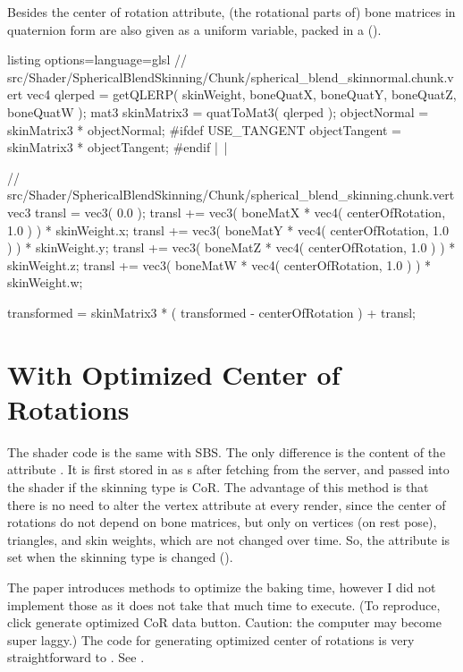\documentclass{homework}
\begin{document}
Besides the center of rotation attribute, (the rotational parts of) bone matrices in quaternion form are also given as a uniform variable, packed in a  ().

\begin{tcblisting}{listing options={language=glsl}}
// src/Shader/SphericalBlendSkinning/Chunk/spherical_blend_skinnormal.chunk.vert
vec4 qlerped = getQLERP( skinWeight, boneQuatX, boneQuatY, boneQuatZ, boneQuatW );
mat3 skinMatrix3 = quatToMat3( qlerped );
objectNormal = skinMatrix3 * objectNormal;
#ifdef USE_TANGENT
  objectTangent = skinMatrix3 * objectTangent;
#endif |\ |

// src/Shader/SphericalBlendSkinning/Chunk/spherical_blend_skinning.chunk.vert
vec3 transl = vec3( 0.0 );
transl += vec3( boneMatX * vec4( centerOfRotation, 1.0 ) ) * skinWeight.x;
transl += vec3( boneMatY * vec4( centerOfRotation, 1.0 ) ) * skinWeight.y;
transl += vec3( boneMatZ * vec4( centerOfRotation, 1.0 ) ) * skinWeight.z;
transl += vec3( boneMatW * vec4( centerOfRotation, 1.0 ) ) * skinWeight.w;

transformed = skinMatrix3 * ( transformed - centerOfRotation ) + transl;
\end{tcblisting}

\section{With Optimized Center of Rotations}
The shader code is the same with SBS. The only difference is the content of the attribute . It is first stored in  as s after fetching from the server, and passed into the shader if the skinning type is CoR. The advantage of this method is that there is no need to alter the vertex attribute at every render, since the center of rotations do not depend on bone matrices, but only on vertices (on rest pose), triangles, and skin weights, which are not changed over time. So, the attribute is set when the skinning type is changed ().

The paper \cite{Le2016} introduces methods to optimize the baking time, however I did not implement those as it does not take that much time to execute. (To reproduce, click generate optimized CoR data button. Caution: the computer may become super laggy.) The code for generating optimized center of rotations is very straightforward to \cite[Equation (4)]{Le2016}. See .
\end{document}

